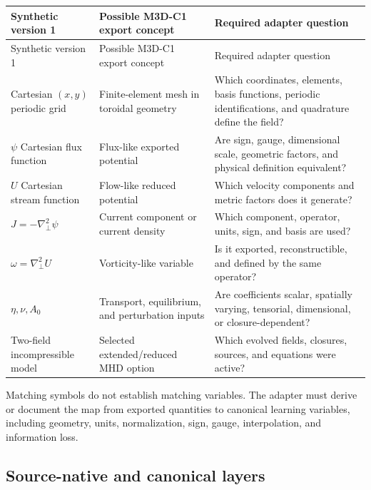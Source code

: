 \documentclass[11pt]{article}
\newcommand{\Lap}{\nabla_{\!\perp}^{2}}
\begin{document}
\begin{longtable}{p{}p{}p{}}
\toprule
Synthetic version 1 & Possible M3D-C1 export concept & Required adapter question \\
\midrule
\endfirsthead
\toprule
Synthetic version 1 & Possible M3D-C1 export concept & Required adapter question \\
\midrule
\endhead
Cartesian $(x,y)$ periodic grid & Finite-element mesh in toroidal geometry & Which coordinates, elements, basis functions, periodic identifications, and quadrature define the field? \\
$\psi$ Cartesian flux function & Flux-like exported potential & Are sign, gauge, dimensional scale, geometric factors, and physical definition equivalent? \\
$U$ Cartesian stream function & Flow-like reduced potential & Which velocity components and metric factors does it generate? \\
$J=-\Lap\psi$ & Current component or current density & Which component, operator, units, sign, and basis are used? \\
$\omega=\Lap U$ & Vorticity-like variable & Is it exported, reconstructible, and defined by the same operator? \\
$\eta,\nu,A_0$ & Transport, equilibrium, and perturbation inputs & Are coefficients scalar, spatially varying, tensorial, dimensional, or closure-dependent? \\
Two-field incompressible model & Selected extended/reduced MHD option & Which evolved fields, closures, sources, and equations were active? \\
\bottomrule
\end{longtable}

\begin{adapterbox}
Matching symbols do not establish matching variables. The adapter must derive or document the map from exported quantities to canonical learning variables, including geometry, units, normalization, sign, gauge, interpolation, and information loss.
\end{adapterbox}

\subsection{Source-native and canonical layers}
\end{document}
